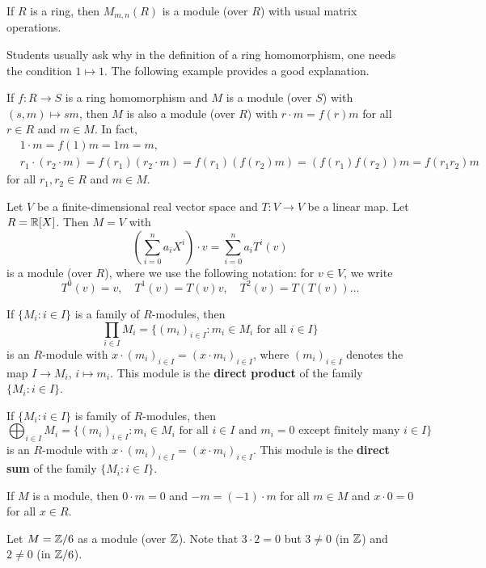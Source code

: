 \begin{example}
If $R$ is a ring, then $M_{m,n}(R)$ is a module (over $R$) with usual matrix operations. 
\end{example}

Students usually ask why in the definition of a ring homomorphism, one needs
the condition $1\mapsto 1$. The following example provides a good explanation. 

\begin{example}
If $f\colon R\to S$ is a ring homomorphism and $M$ is a module (over $S$) with 
$(s,m)\mapsto sm$, then 
$M$ is also a module (over $R$) with $r\cdot m=f(r)m$ for all $r\in R$ and $m\in M$. In fact, 
\begin{align*}
&1\cdot m=f(1)m=1m=m,\\
&r_1\cdot (r_2\cdot m)=f(r_1)(r_2\cdot m)=f(r_1)(f(r_2)m)=(f(r_1)f(r_2))m=f(r_1r_2)m
\end{align*}
for all $r_1,r_2\in R$ and $m\in M$.	  	
\end{example}
%
\begin{example}
Let $V$ be a finite-dimensional real vector space and $T\colon V\to V$ be a linear map.  
Let $R=\mathbb{R}[X]$. Then $M=V$ with 
\[
\left(\sum_{i=0}^na_iX^i\right)\cdot v=\sum_{i=0}^na_iT^i(v)
\]	
is a module (over $R$), where we use the following notation: for $v\in V$, we write 
\[
    T^0(v)=v,\quad 
    T^1(v)=T(v)v,\quad 
    T^2(v)=T(T(v))\dots 
\]
\end{example}

\begin{example}
If $\{M_i:i\in I\}$ is a family of $R$-modules, then  	
\[
\prod_{i\in I}M_i=\{(m_i)_{i\in I}:m_i\in M_i\text{ for all $i\in I$}\}
\]
is an $R$-module with 
$x\cdot (m_i)_{i\in I}=(x\cdot m_i)_{i\in I}$, 
where $(m_i)_{i\in I}$ denotes the map $I\to M_i$, $i\mapsto m_i$.
This module is the \textbf{direct product} of the family $\{M_i:i\in I\}$.
\end{example}
%
\begin{example}
If $\{M_i:i\in I\}$ is family of $R$-modules, then   	
\[
\bigoplus_{i\in I}M_i=\{(m_i)_{i\in I}:m_i\in M_i\text{ for all $i\in I$ and $m_i=0$ except finitely many $i\in I$}\}
\]
is an $R$-module with 
$x\cdot (m_i)_{i\in I}=(x\cdot m_i)_{i\in I}$. 
This module is the \textbf{direct sum} of the family $\{M_i:i\in I\}$. 
\end{example}
%
If $M$ is a module, then $0\cdot m=0$ and $-m=(-1)\cdot m$ for all $m\in M$ and 
$x\cdot 0=0$ for all $x\in R$. 
%
\begin{example}
Let $M=\mathbb{Z}/6$ as a module (over $\mathbb{Z}$). Note that 
$3\cdot 2=0$ but $3\ne 0$ (in $\mathbb{Z}$) and $2\ne 0$ (in $\mathbb{Z}/6$).  
\end{example}

